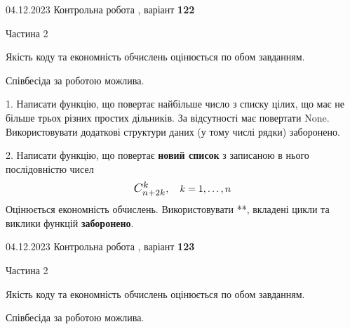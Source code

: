\documentclass[12pt, ukrainian]{article}
\begin{document}
{{{{{{{{{{{{{{{{{{{{{%



\begin {Huge}
{{04.12.2023 Контрольна робота , варіант  \No \textbf { 122 }\par}}

\begin{center}Частина 2
\end{center}
\vspace{10mm}
\end {Huge}

{
\begin {Large}
Якість коду та економність обчислень оцінюється по обом завданням.

Співбесіда за роботою можлива.

\vspace{5mm}

1. Написати функцію, що повертає найбільше число з списку цілих, що має не більше трьох різних простих дільників. За відсутності має повертати None. Використовувати додаткові структури даних (у тому числі рядки) заборонено.

\vspace{10mm}



2. 
Написати функцію, що повертає \textbf{новий список} з записаною в нього послідовністю чисел
$$\scalebox{1.2}{$C_{n+2k}^{k}$}, \quad k=1,\ldots,n$$
Оцінюється економність обчислень. Використовувати **, вкладені цикли та виклики функцій \textbf{заборонено}.

\end{Large}\newpage




\begin {Huge}
{{04.12.2023 Контрольна робота , варіант  \No \textbf { 123 }\par}}

\begin{center}Частина 2
\end{center}
\vspace{10mm}
\end {Huge}

{
\begin {Large}
Якість коду та економність обчислень оцінюється по обом завданням.

Співбесіда за роботою можлива.

\vspace{5mm}


\end{Large}}}}}}}}}}}}}}}}}}}}}}}}
\end{document}
